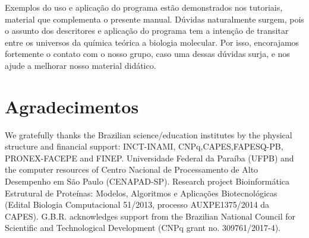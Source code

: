 \documentclass[a4paper,11pt]{refart}
\begin{document}
Exemplos do uso e aplicação do programa estão demonstrados nos tutoriais, material que complementa o presente manual. Dúvidas naturalmente surgem, pois o assunto dos descritores e aplicação do programa tem a intenção de transitar entre os universos da química teórica a biologia molecular. Por isso, encorajamos fortemente o contato com o nosso grupo, caso uma dessas dúvidas surja, e nos ajude a melhorar nosso material didático. 


\newpage
\section*{Agradecimentos}

We gratefully thanks the Brazilian science/education institutes by the physical structure and financial support: INCT-INAMI, CNPq,CAPES,FAPESQ-PB, PRONEX-FACEPE and FINEP. Universidade Federal da Paraíba (UFPB) and the computer resources of Centro Nacional de Processamento de Alto Desempenho em São Paulo (CENAPAD-SP). 		
Research project Bioinformática Estrutural de Proteínas: Modelos, Algoritmos e Aplicações Biotecnológicas (Edital Biologia Computacional 51/2013, processo AUXPE1375/2014 da CAPES). G.B.R. acknowledges support from the Brazilian National Council for Scientific and Technological Development (CNPq grant no. 309761/2017-4).




\newpage






\end{document}
